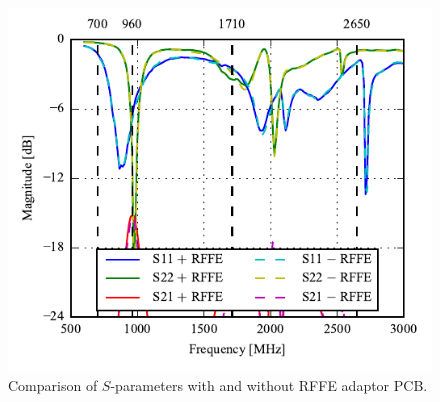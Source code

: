 \begin{figure}[htbp]
    \centering
    \includegraphics{img/optical_rffe/compare_sparams2}
    \caption{Comparison of $S$-parameters with and without RFFE adaptor PCB. }
    \label{fig:rffe_test_results2}
\end{figure}
